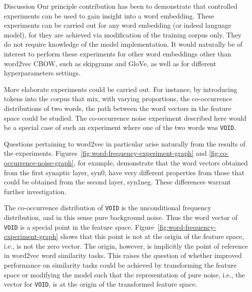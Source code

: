 \documentclass{article} %
\newcommand{\word}[1]{\texttt{#1}}
\begin{document}
\begin{section}{Discussion}\label{future-directions}
Our principle contribution has been to demonstrate that controlled
experiments can be used to gain insight into a word embedding.  These
experiments can be carried out for any word embedding (or indeed
language model), for they are achieved via modification of the training
corpus only.  They do not require knowledge of the model implementation.
It would naturally be of interest to perform these experiments for other
word embeddings other than word2vec CBOW, such as skipgrams and GloVe,
as well as for different hyperparameters settings.

More elaborate experiments could be carried out.  For instance, by
introducing tokens into the corpus that mix, with varying proportions,
the co-occurrence distributions of two words, the path between the word
vectors in the feature space could be studied.  The co-occurrence noise
experiment described here would be a special case of such an
experiment where one of the two words was \word{VOID}.

Questions pertaining to word2vec in particular arise naturally from the
results of the experiments.
Figures~\ref{fig:word-frequency-experiment-graph} and
\ref{fig:co-occurrence-noise-graph}, for example, demonstrate that the
word vectors obtained from the first synaptic layer, syn0, have very
different properties from those that could be obtained from the second
layer, syn1neg.  These differences warrant further investigation.

The co-occurrence distribution of \word{VOID} is the unconditional
frequency distribution, and in this sense pure background noise.  Thus
the word vector of \word{VOID} is a special point in the feature space.
Figure~\ref{fig:word-frequency-experiment-graph} shows that this point
is not at the origin of the feature space, i.e., is not the zero vector.
The origin, however, is implicitly the point of reference in word2vec
word similarity tasks.  This raises the question of whether improved
performance on similarity tasks could be achieved by transforming the
feature space or modifying the model such that the representation of
pure noise, i.e., the vector for \word{VOID}, is at the origin of the
transformed feature space.



\end{section}

\clearpage
\footnotesize


\end{document}
